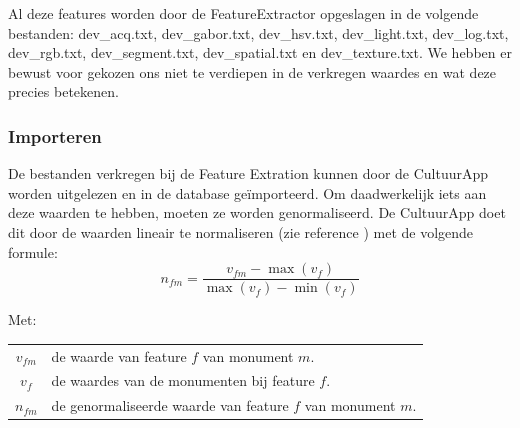 \documentclass[a4paper,10pt]{article}
\begin{document}
		Al deze features worden door de FeatureExtractor opgeslagen in de volgende bestanden: dev\_acq.txt, dev\_gabor.txt, dev\_hsv.txt, dev\_light.txt, dev\_log.txt, dev\_rgb.txt, dev\_segment.txt, dev\_spatial.txt en dev\_texture.txt. We hebben er bewust voor gekozen ons niet te verdiepen in de verkregen waardes en wat deze precies betekenen.
		
		\subsubsection{Importeren}
		De bestanden verkregen bij de Feature Extration kunnen door de CultuurApp worden uitgelezen en in de database ge\"importeerd. Om daadwerkelijk iets aan deze waarden te hebben, moeten ze worden genormaliseerd. De CultuurApp doet dit door de waarden lineair te normaliseren (zie reference \cite{11}) met de volgende formule:
		\begin{equation}
			n_{fm} = \frac{v_{fm} - \max(v_{f})}{\max(v_{f}) - \min(v_{f})}
		\end{equation}
		
		\noindent Met:
		\begin{center}
			\begin{tabular}{ c | l }
				$v_{fm}$ & de waarde van feature $f$ van monument $m$.\\
				$v_{f}$ & de waardes van de monumenten bij feature $f$.\\
				$n_{fm}$ & de genormaliseerde waarde van feature $f$ van monument $m$.
			\end{tabular}
		\end{center}
		
\end{document}
